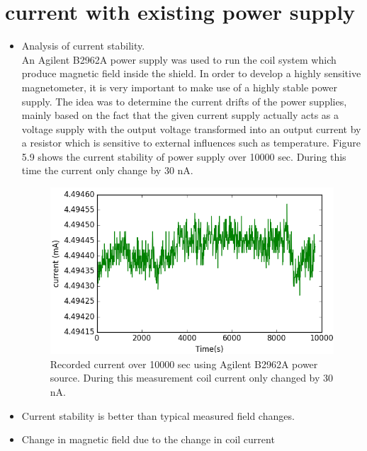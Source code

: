    \section{current with existing power supply}
   \begin{itemize}
   \item Analysis of current stability.\\
 An Agilent B2962A power supply was used to run the coil system which produce magnetic field inside the shield. In order to develop a highly sensitive magnetometer, it is very important to make use of a highly stable power supply. The idea was to determine the current drifts of the power supplies, mainly based on the fact that the given current supply actually acts as a voltage supply with the output voltage transformed into an output current by a resistor which is sensitive to external influences such as temperature. Figure 5.9 shows the current stability of power supply over 10000 sec. During this time the current only change by 30 nA.  
   \begin{figure}[h]
\centering
\includegraphics[width=0.8\linewidth]{figures/current}
\caption{Recorded current over 10000 sec using Agilent B2962A power source. During this measurement coil current only changed by 30 nA. }
\end{figure}
   \item Current stability is better than typical measured field changes.
   \item Change in magnetic field due to the change in coil current\\

\end{itemize}
